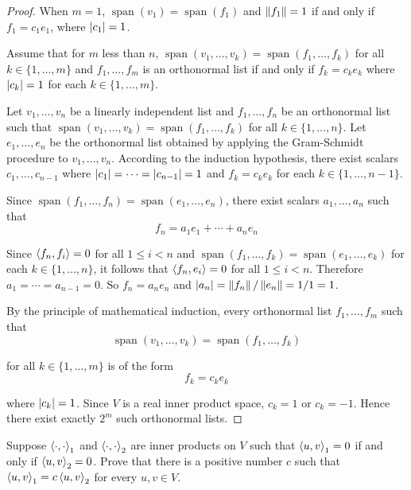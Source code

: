 \begin{proof}
    When $m = 1$, $\operatorname{span}(v_{1}) = \operatorname{span}(f_{1})$ and $\left\Vert{f_{1}}\right\Vert = 1$ if and only if $f_{1} = c_{1}e_{1}$, where $\left\vert{c_{1}}\right\vert = 1$.

    Assume that for $m$ less than $n$, $\operatorname{span}(v_{1}, \ldots, v_{k}) = \operatorname{span}(f_{1}, \ldots, f_{k})$ for all $k \in \{ 1, \ldots, m \}$ and $f_{1}, \ldots, f_{m}$ is an orthonormal list if and only if $f_{k} = c_{k}e_{k}$ where $\left\vert{c_{k}}\right\vert = 1$ for each $k \in \{ 1, \ldots, m \}$.

    Let $v_{1}, \ldots, v_{n}$ be a linearly independent list and $f_{1}, \ldots, f_{n}$ be an orthonormal list such that $\operatorname{span}(v_{1}, \ldots, v_{k}) = \operatorname{span}(f_{1}, \ldots, f_{k})$ for all $k \in \{ 1, \ldots, n \}$. Let $e_{1}, \ldots, e_{n}$ be the orthonormal list obtained by applying the Gram-Schmidt procedure to $v_{1}, \ldots, v_{n}$. According to the induction hypothesis, there exist scalars $c_{1}, \ldots, c_{n-1}$ where $\left\vert{c_{1}}\right\vert = \cdots = \left\vert{c_{n-1}}\right\vert = 1$ and $f_{k} = c_{k}e_{k}$ for each $k\in\{1, \ldots, n-1\}$.

    Since $\operatorname{span}(f_{1}, \ldots, f_{n}) = \operatorname{span}(e_{1}, \ldots, e_{n})$, there exist scalars $a_{1}, \ldots, a_{n}$ such that
    \[
        f_{n} = a_{1}e_{1} + \cdots + a_{n}e_{n}
    \]

    Since $\left\langle{f_{n}, f_{i}}\right\rangle = 0$ for all $1\leq i < n$ and $\operatorname{span}(f_{1}, \ldots, f_{k}) = \operatorname{span}(e_{1}, \ldots, e_{k})$ for each $k\in \{ 1,\ldots, n \}$, it follows that $\left\langle{f_{n}, e_{i}}\right\rangle = 0$ for all $1\leq i < n$. Therefore $a_{1} = \cdots = a_{n-1} = 0$. So $f_{n} = a_{n}e_{n}$ and $\left\vert{a_{n}}\right\vert = \left\Vert{f_{n}}\right\Vert/\left\Vert{e_{n}}\right\Vert = 1/1 = 1$.

    By the principle of mathematical induction, every orthonormal list $f_{1}, \ldots, f_{m}$ such that
    \[
        \operatorname{span}(v_{1}, \ldots, v_{k}) = \operatorname{span}(f_{1}, \ldots, f_{k})
    \]

    for all $k\in\{1, \ldots, m\}$ is of the form
    \[
        f_{k} = c_{k}e_{k}
    \]

    where $\left\vert{c_{k}}\right\vert = 1$. Since $V$ is a real inner product space, $c_{k} = 1$ or $c_{k} = -1$. Hence there exist exactly $2^{m}$ such orthonormal lists.
\end{proof}
\newpage

\begin{exercise}
    Suppose $\left\langle{\cdot, \cdot}\right\rangle_{1}$ and $\left\langle{\cdot, \cdot}\right\rangle_{2}$ are inner products on $V$ such that $\left\langle{u, v}\right\rangle_{1} = 0$ if and only if $\left\langle{u, v}\right\rangle_{2} = 0$. Prove that there is a positive number $c$ such that $\left\langle{u, v}\right\rangle_{1} = c\left\langle{u, v}\right\rangle_{2}$ for every $u, v\in V$.
\end{exercise}

